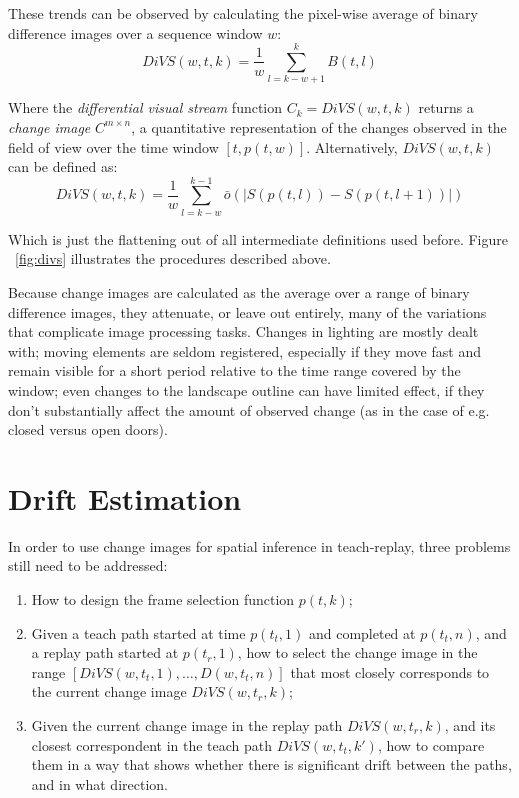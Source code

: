 \documentclass[twocolumn, 9pt,fleqn]{jsproceedings}
\begin{document}
These trends can be observed by calculating the pixel-wise average of binary difference images over a sequence window $w$:
\begin{equation}
DiVS(w, t, k) = \frac{1}{w} \sum_{l=k-w+1}^{k}{B(t, l)}
\end{equation}

Where the \textit{differential visual stream} function $C_k = DiVS(w, t, k)$ returns a  \textit{change image} $C^{m \times n}$, a quantitative representation of the changes observed in the field of view over the time window $[t, p(t, w)]$. Alternatively, $DiVS(w, t, k)$ can be defined as:
\begin{equation}
DiVS(w, t, k) = \frac{1}{w} \sum_{l=k-w}^{k-1}{\bar{o}(|S(p(t, l)) - S(p(t, l+1))|)}
\end{equation}

Which is just the flattening out of all intermediate definitions used before. Figure ~\ref{fig:divs} illustrates the procedures described above.

Because change images are calculated as the average over a range of binary difference images, they attenuate, or leave out entirely, many of the variations that complicate image processing tasks. Changes in lighting are mostly dealt with; moving elements are seldom registered, especially if they move fast and remain visible for a short period relative to the time range covered by the window; even changes to the landscape outline can have limited effect, if they don't substantially affect the amount of observed change (as in the case of e.g. closed versus open doors).

\section{Drift Estimation}

In order to use change images for spatial inference in teach-replay, three problems still need to be addressed:

\begin{enumerate}
\item How to design the frame selection function $p(t, k)$;
\item Given a teach path started at time $p(t_t, 1)$ and completed at $p(t_t, n)$, and a replay path started at $p(t_r, 1)$, how to select the change image in the range $[DiVS(w, t_t, 1), \dotsc, D(w, t_t, n)]$ that most closely corresponds to the current change image $DiVS(w, t_r, k)$;
\item Given the current change image in the replay path $DiVS(w, t_r, k)$, and its closest correspondent in the teach path $DiVS(w, t_t, k')$, how to compare them in a way that shows whether there is significant drift between the paths, and in what direction.
\end{enumerate}
\end{document}
